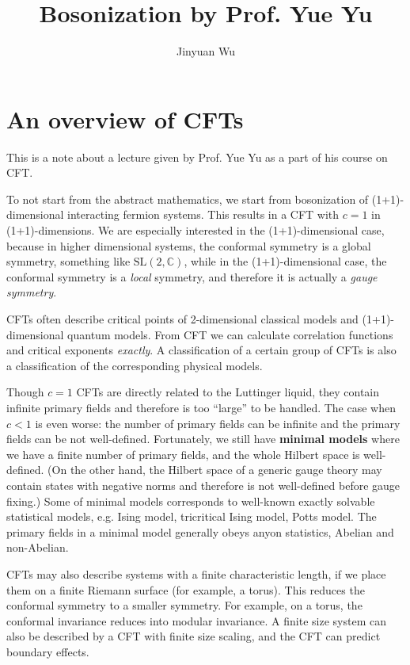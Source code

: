 \documentclass[hyperref, a4paper]{article}
\title{Bosonization by Prof. Yue Yu}
\author{Jinyuan Wu}
\newcommand*{\concept}[1]{{\textbf{#1}}}
\begin{document}
\maketitle

\section{An overview of CFTs}

This is a note about a lecture given by Prof. Yue Yu as a part of his course on CFT.

To not start from the abstract mathematics, we start from bosonization of (1+1)-dimensional 
interacting fermion systems. This results in a CFT with $c=1$ in (1+1)-dimensions.
We are especially interested in the (1+1)-dimensional case, because in higher dimensional systems, the conformal 
symmetry is a global symmetry, something like $\mathrm{SL}(2, \mathbb{C})$, while in the 
(1+1)-dimensional case, the conformal symmetry is a \emph{local} symmetry, and therefore it is actually a \emph{gauge symmetry}.

CFTs often describe critical points of 2-dimensional classical models and (1+1)-dimensional quantum models.
From CFT we can calculate correlation functions and critical exponents \emph{exactly}.
A classification of a certain group of CFTs is also a classification of the corresponding physical models.

Though $c=1$ CFTs are directly related to the Luttinger liquid, they contain infinite primary fields and therefore is too ``large'' to be handled.
The case when $c < 1$ is even worse: the number of primary fields can be infinite and the primary fields can be not well-defined.
Fortunately, we still have \concept{minimal models} where we have a finite number of primary fields, and the whole Hilbert space is well-defined.
(On the other hand, the Hilbert space of a generic gauge theory may contain states with negative norms and therefore is not well-defined before gauge fixing.)
Some of minimal models corresponds to well-known exactly solvable statistical models, e.g. Ising model, tricritical Ising model, Potts model.
The primary fields in a minimal model generally obeys anyon statistics, Abelian and non-Abelian.

CFTs may also describe systems with a finite characteristic length, if we place them on a finite Riemann surface (for example, a torus). 
This reduces the conformal symmetry to a smaller symmetry.
For example, on a torus, the conformal invariance reduces into modular invariance.
A finite size system can also be described by a CFT with finite size scaling, and the CFT can predict boundary effects.
\end{document}
